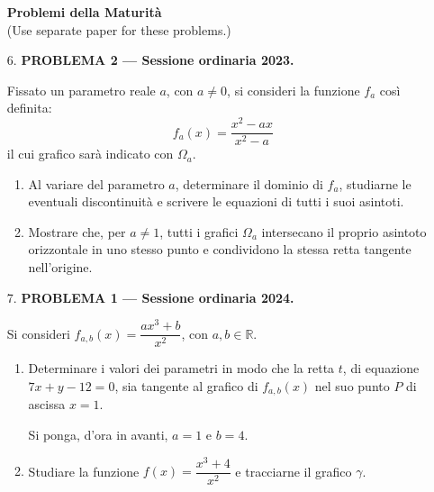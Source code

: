 \documentclass[12pt, twoside]{article}
\begin{document}
\begin{enumerate}[itemsep=0.4cm]
\begin{figure}[H]
\begin{center}
\end{center}
\end{figure}

\newpage

\begin{center}
\textbf{\large Problemi della Maturit\`a} \\[2pt]
\small (Use separate paper for these problems.)
\end{center}

\vspace{0.4cm}

\item[6.] \textbf{PROBLEMA 2 --- Sessione ordinaria 2023.}

Fissato un parametro reale $a$, con $a\ne 0$, si consideri la
funzione $f_a$ cos\`i definita:
$$f_a(x)=\dfrac{x^2-ax}{x^2-a}$$
il cui grafico sar\`a indicato con $\Omega_a$.

\begin{enumerate}[label=(\alph*), itemsep=0.25cm]
  \item Al variare del parametro $a$, determinare il dominio di
  $f_a$, studiarne le eventuali discontinuit\`a e scrivere le
  equazioni di tutti i suoi asintoti.

  \item Mostrare che, per $a\ne 1$, tutti i grafici $\Omega_a$
  intersecano il proprio asintoto orizzontale in uno stesso
  punto e condividono la stessa retta tangente nell'origine.
\end{enumerate}

\vspace{0.6cm}

\item[7.] \textbf{PROBLEMA 1 --- Sessione ordinaria 2024.}

Si consideri $\displaystyle f_{a,b}(x)=\dfrac{ax^3+b}{x^2}$, con
$a,b\in\mathbb{R}$.

\begin{enumerate}[label=(\alph*), itemsep=0.25cm]
  \item Determinare i valori dei parametri in modo che la retta
  $t$, di equazione $7x+y-12=0$, sia tangente al grafico di
  $f_{a,b}(x)$ nel suo punto $P$ di ascissa $x=1$.

  \medskip
  Si ponga, d'ora in avanti, $a=1$ e $b=4$.

  \item Studiare la funzione $\displaystyle f(x)=\dfrac{x^3+4}{x^2}$
  e tracciarne il grafico $\gamma$.
\end{enumerate}

\end{enumerate}
\end{document}
